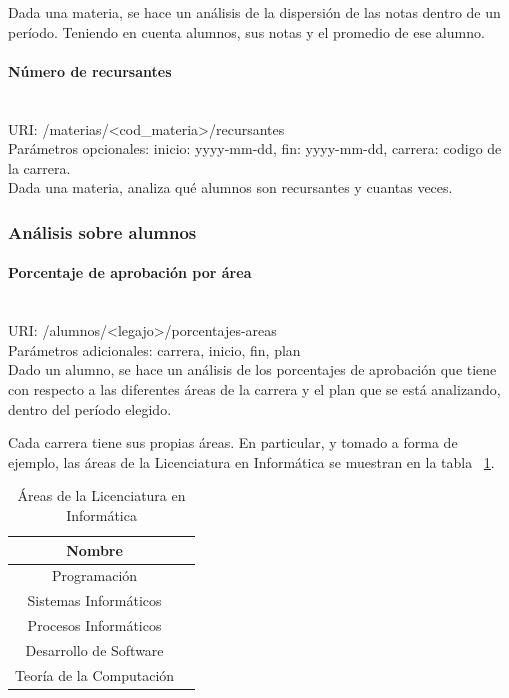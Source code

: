 Dada una materia, se hace un análisis de la dispersión de las notas dentro de un período. Teniendo en cuenta alumnos, sus notas y el promedio de ese alumno.

\paragraph{Número de recursantes}\mbox{}\\

URI: /materias/<cod\_materia>/recursantes \\

Parámetros opcionales: inicio: yyyy-mm-dd, fin: yyyy-mm-dd, carrera: codigo de la carrera. \\

Dada una materia, analiza qué alumnos son recursantes y cuantas veces.


\subsubsection{Análisis sobre alumnos}

\paragraph{Porcentaje de aprobación por área}\mbox{}\\

URI: /alumnos/<legajo>/porcentajes-areas \\

Parámetros adicionales: carrera, inicio, fin, plan \\

Dado un alumno, se hace un análisis de los porcentajes de aprobación que tiene con respecto a las diferentes áreas de la carrera y el plan que se está analizando, dentro del período elegido.

Cada carrera tiene sus propias áreas. En particular, y tomado a forma de ejemplo, las áreas de la Licenciatura en Informática se muestran en la tabla ~\ref{tab:tabla_areas}.

\begin{table}[!htbp]
    \centering
    \makegapedcells
    \begin{tabular}{|c|c|}
    \hline
    Nombre \\ \hline
    Programación \\ \hline
    Sistemas Informáticos \\ \hline
    Procesos Informáticos\\ \hline
    Desarrollo de Software \\ \hline
    Teoría de la Computación \\ \hline
    \end{tabular}
    \caption{Áreas de la Licenciatura en Informática}
    \label{tab:tabla_areas}
\end{table}

